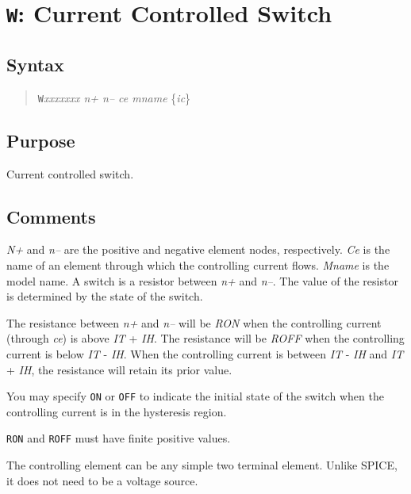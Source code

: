 \section{{\tt W}: Current Controlled Switch}
\subsection{Syntax}
\begin{verse}
{\tt W}{\it xxxxxxx n+ n-- ce mname} \{{\it ic}\}
\end{verse}
\subsection{Purpose}

Current controlled switch.
\subsection{Comments}

{\it N+} and {\it n--} are the positive and negative element nodes,
respectively.  {\it Ce} is the name of an element through which
the controlling current flows.  {\it Mname} is the model name.  A
switch is a resistor between {\it n+} and {\it n--}.  The value of
the resistor is determined by the state of the switch.

The resistance between {\it n+} and {\it n--} will be {\it RON}
when the controlling current (through {\it ce}) is above {\it IT}
+ {\it IH}.  The resistance will be {\it ROFF} when the controlling
current is below {\it IT} - {\it IH}.  When the controlling current
is between {\it IT} - {\it IH} and {\it IT} + {\it IH}, the resistance
will retain its prior value.

You may specify {\tt ON} or {\tt OFF} to indicate the initial state
of the switch when the controlling current is in the hysteresis
region.

{\tt RON} and {\tt ROFF} must have finite positive values.

The controlling element can be any simple two terminal element.
Unlike SPICE, it does not need to be a voltage source.
